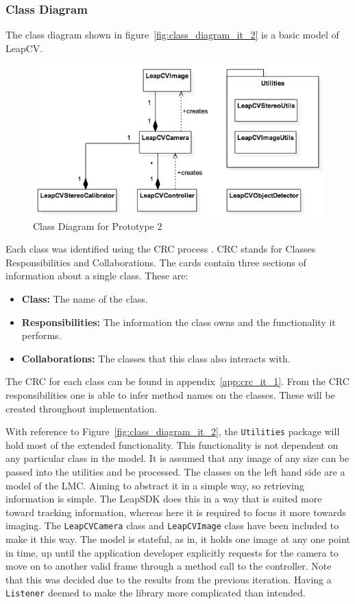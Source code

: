 \documentclass[11pt,oneside]{report}
\newcommand\code[1]{\texttt{#1}}
\begin{document}
		\subsubsection{Class Diagram}
		The class diagram shown in figure~\ref{fig:class_diagram_it_2} is a basic model of LeapCV.
		\begin{figure}
		\centering
    			\includegraphics[width=\textheight, angle=90]{class_diagram_it_2}
    			\caption{Class Diagram for Prototype 2 \protect {\label{fig:class_diagram_it_2}}}
		\end{figure}			
		Each class was identified using the CRC process \cite{web:crc}. 
		CRC stands for Classes Responsibilities and Collaborations.
		The cards contain three sections of information about a single class.
		These are:
		\begin{itemize}
			\item \textbf{Class:} The name of the class.
			\item \textbf{Responsibilities:} The information the class owns and the functionality it performs.
			\item \textbf{Collaborations:} The classes that this class also interacts with.
		\end{itemize}
		
		The CRC for each class can be found in appendix~\ref{app:crc_it_1}.
		From the CRC responsibilities one is able to infer method names on the classes.
		These will be created throughout implementation.
		
		With reference to Figure~\ref{fig:class_diagram_it_2}, the \code{Utilities} package will hold most of the extended functionality.
		This functionality is not dependent on any particular class in the model.
		It is assumed that any image of any size can be passed into the utilities and be processed.
		The classes on the left hand side are a model of the LMC.
		Aiming to abstract it in a simple way, so retrieving information is simple.
		The LeapSDK does this in a way that is suited more toward tracking information, whereas here it is required to focus it more towards imaging.
		The \code{LeapCVCamera} class and \code{LeapCVImage} class have been included to make it this way.
		The model is stateful, as in, it holds one image at any one point in time, up until the application developer explicitly requests for the camera to move on to another valid frame through a method call to the controller.
		Note that this was decided due to the results from the previous iteration.
		Having a \code{Listener} deemed to make the library more complicated than intended.
		
\end{document}
